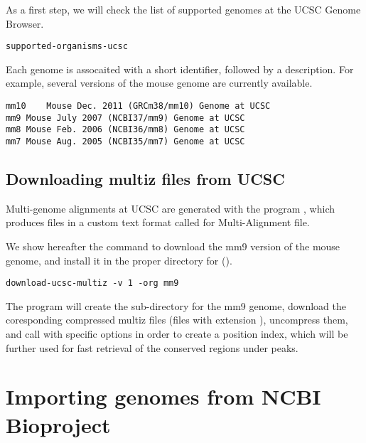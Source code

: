 As a first step, we will check the list of supported genomes at the
UCSC Genome Browser.

\begin{lstlisting}
supported-organisms-ucsc
\end{lstlisting}

Each genome is assocaited with a short identifier, followed by a
description. For example, several versions of the mouse genome are
currently available.


\begin{small}
\begin{verbatim}
mm10	Mouse Dec. 2011 (GRCm38/mm10) Genome at UCSC
mm9	Mouse July 2007 (NCBI37/mm9) Genome at UCSC
mm8	Mouse Feb. 2006 (NCBI36/mm8) Genome at UCSC
mm7	Mouse Aug. 2005 (NCBI35/mm7) Genome at UCSC
\end{verbatim}
\end{small}

\subsection{Downloading multiz files from UCSC}

Multi-genome alignments at UCSC are generated with the program
, which produces files in a custom text format called
 for Multi-Alignment file.

We show hereafter the command to download the mm9 version of the mouse
genome, and install it in the proper directory for
 ().

\begin{lstlisting}
download-ucsc-multiz -v 1 -org mm9
\end{lstlisting}

The program will create the sub-directory for the mm9 genome, download
the coresponding compressed multiz files (files with extension
), uncompress them, and call 
with specific options in order to create a position index, which will
be further used for fast retrieval of the conserved regions under
peaks.

\section{Importing genomes from NCBI Bioproject}


